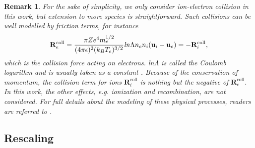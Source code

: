\documentclass{article}
\newtheorem*{remark}{Remark}
\begin{document}
\begin{remark}
  \label{rem:coll}
  For the sake of simplicity, we only consider ion-electron collision in this work, but
extension to more species is straightforward. Such collisions can be well modelled by
friction terms, for instance \citep[][Sec.~5.6.2]{chen2016}
\begin{equation} \label{equ:collision}
    \mathbf{R}_{e}^{\text{coll}} = \frac{\pi Ze^4m_e^{1/2}}{(4\pi\epsilon)^2(k_BT_e)^{3/2}}\text{\emph{ln}}\Lambda n_en_i(\mathbf{u}_i - \mathbf{u}_e) = - \mathbf{R}_{i}^{\text{coll}},  
\end{equation}
which is the collision force acting on electrons. \emph{ln}$\Lambda$ is called the \emph{Coulomb
  logarithm} and is usually taken as a constant \cite{chen2016}. Because of the
conservation of momentum, the collision term for ions $\mathbf{R}_{i}^{\text{coll}}$ is
nothing but the negative of $\mathbf{R}_{e}^{\text{coll}}$. In this work, the other
effects, e.g. ionization and recombination, are not considered. For full details about the
modeling of these physical processes, readers are referred to
\cite[][Sec.~3.2]{fuchs_2021}.
\end{remark}

\subsection{Rescaling}
\label{sec:rescaling}
\end{document}
